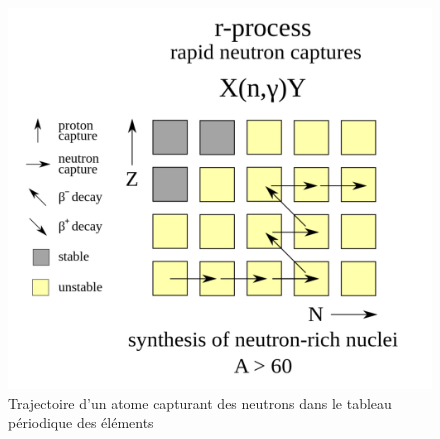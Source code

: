  \begin{figure}[H]
 	\centering
 	\includegraphics[scale=0.14]{images/processusr}
 	\caption{Trajectoire d'un atome capturant des neutrons dans le tableau périodique des éléments}
 \end{figure}\bigskip 
 
 
 



 
 
